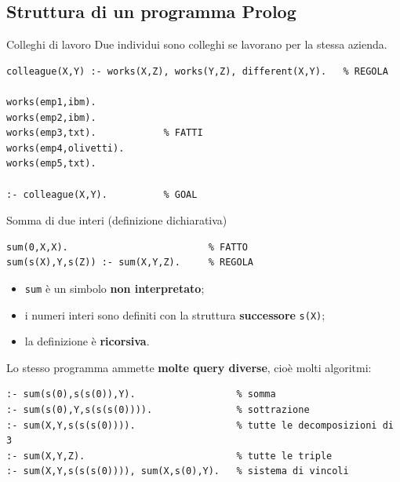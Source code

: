 \subsection{Struttura di un programma Prolog}


\begin{Example}{Colleghi di lavoro}{}
  Due individui sono colleghi se lavorano per la stessa azienda.
\begin{lstlisting}
colleague(X,Y) :- works(X,Z), works(Y,Z), different(X,Y).   % REGOLA

works(emp1,ibm).
works(emp2,ibm).
works(emp3,txt).            % FATTI
works(emp4,olivetti).
works(emp5,txt).

:- colleague(X,Y).          % GOAL
\end{lstlisting}
\end{Example}

\begin{Example}{Somma di due interi (definizione dichiarativa)}{}
\begin{lstlisting}
sum(0,X,X).                         % FATTO
sum(s(X),Y,s(Z)) :- sum(X,Y,Z).     % REGOLA
\end{lstlisting}
  \begin{itemize}
    \item \texttt{sum} è un simbolo \textbf{non interpretato};
    \item i numeri interi sono definiti con la struttura \textbf{successore}
      \texttt{s(X)};
    \item la definizione è \textbf{ricorsiva}.
  \end{itemize}
  Lo stesso programma ammette \textbf{molte query diverse}, cioè molti algoritmi:
\begin{lstlisting}
:- sum(s(0),s(s(0)),Y).                  % somma
:- sum(s(0),Y,s(s(s(0)))).               % sottrazione
:- sum(X,Y,s(s(s(0)))).                  % tutte le decomposizioni di 3
:- sum(X,Y,Z).                           % tutte le triple
:- sum(X,Y,s(s(s(0)))), sum(X,s(0),Y).   % sistema di vincoli
\end{lstlisting}
\end{Example}


